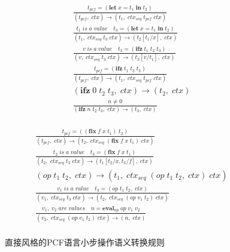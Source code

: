 \begin{figure}[t]
    \centering
    \begin{subfigure}[t]{0.43\textwidth}
        \setlength{\jot}{10pt}
        \begin{gather*}
            \displaystyle{\frac{t_{pcf}=(\mathbf{let}\; x = t_1\; \mathbf{in}\; t_2)} {(t_{pcf},\; ctx)\rightarrow (t_1,\; ctx_{seq}\; t_{pcf}\; ctx)}} \\
            \displaystyle{\frac{t_1\; is\; a\; value\quad t_3=(\mathbf{let}\; x = t_1\; \mathbf{in}\; t_2)} {(t_1,\; ctx_{seq}\; t_3\; ctx)\rightarrow (t_2 [t_1/x],\; ctx)}} \\
            \displaystyle{\frac{v\; is\; a\; value\quad t_3=(\mathbf{ifz}\; t_1\; t_2\; t_3)} {(v,\; ctx_{seq}\; t_3\; ctx)\rightarrow (t_3 [v/t_1],\; ctx)}} \\
            \displaystyle{\frac{t_{pcf}=(\mathbf{ifz}\; t_1\; t_2\; t_3)} {(t_{pcf},\; ctx)\rightarrow (t_1,\; ctx_{seq}\; t_{pcf}\; ctx)}} \\
            \displaystyle{(\mathbf{ifz}\; 0\; t_2\; t_3,\; ctx)\rightarrow (t_2,\; ctx)} \\
            \displaystyle{\frac{n \neq 0}{(\mathbf{ifz}\; n\; t_2\; t_3,\; ctx)\rightarrow (t_3,\; ctx)}} \\
        \end{gather*}
    \end{subfigure}
    \begin{subfigure}[t]{0.55\textwidth}
        \setlength{\jot}{10pt}
        \begin{gather*}
            \displaystyle{\frac{t_{pcf}=((\mathbf{fix}\; f\; x\; t_1)\; t_2)} {(t_{pcf},\; ctx)\rightarrow (t_2,\; ctx_{seq}\; (\mathbf{fix}\; f\; x\; t_1)\; ctx)}} \\
            \displaystyle{\frac{t_2\; is\; a\; value\quad t_3=(\mathbf{fix}\; f\; x\; t_1)} {(t_2,\; ctx_{seq}\; t_3\; ctx)\rightarrow (t_1 [t_2/x,t_3/f],\; ctx)}} \\
            \displaystyle{(op\; t_1\; t_2,\; ctx)\rightarrow (t_1,\; ctx_{seq}\; (op\; t_1\; t_2,\; ctx)\; ctx)} \\
            \displaystyle{\frac{v_1\; is\; a\; value\quad t_3=(op\; t_1\; t_2,\; ctx)} {(v_1,\; ctx_{seq}\; t_3\; ctx)\rightarrow (t_2,\; ctx_{seq}\; (op\; v_1\; t_2)\; ctx)}} \\
            \displaystyle{\frac{v_1,\; v_2\; are\; values\quad n=\mathbf{eval}_{op}\; op\; v_1\; v_2}{(v_2,\; ctx_{seq}\; (op\; v_1\; t_2)\; ctx)\rightarrow (n,\; ctx)}} \\
        \end{gather*}
    \end{subfigure}   
    \caption{直接风格的PCF语言小步操作语义转换规则} \label{pcfopsem}
\end{figure}

